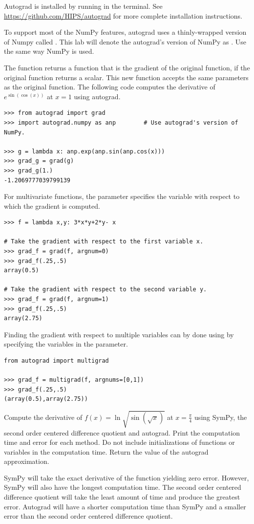 Autograd is installed by running  in the terminal.
See \url{https://github.com/HIPS/autograd} for more complete installation instructions.

To support most of the NumPy features, autograd uses a thinly-wrapped version of Numpy called .
This lab will denote the autograd's version of NumPy as .
Use  the same way NumPy is used.

The function  returns a function that is the gradient of the original function, if the original function returns a scalar.
This new function accepts the same parameters as the original function.
The following code computes the derivative of $e^{\sin\left(\cos\left(x\right)\right)}$ at $x=1$ using autograd.
\begin{lstlisting}
>>> from autograd import grad
>>> import autograd.numpy as anp        # Use autograd's version of NumPy.

>>> g = lambda x: anp.exp(anp.sin(anp.cos(x)))
>>> grad_g = grad(g)
>>> grad_g(1.)
-1.2069777039799139
\end{lstlisting}

For multivariate functions, the parameter  specifies the variable with respect to which the gradient is computed.
\begin{lstlisting}
>>> f = lambda x,y: 3*x*y+2*y- x

# Take the gradient with respect to the first variable x.
>>> grad_f = grad(f, argnum=0)
>>> grad_f(.25,.5)
array(0.5)

# Take the gradient with respect to the second variable y.
>>> grad_f = grad(f, argnum=1)
>>> grad_f(.25,.5)
array(2.75)
\end{lstlisting}

Finding the gradient with respect to multiple variables can by done using  by specifying the variables in the  parameter.

\begin{lstlisting}
from autograd import multigrad

>>> grad_f = multigrad(f, argnums=[0,1])
>>> grad_f(.25,.5)
(array(0.5),array(2.75))
\end{lstlisting}

\begin{problem}
Compute the derivative of $f(x) = \ln \sqrt{ \sin \left(\sqrt {x}\right) }$ at $x=\frac{\pi}{4}$ using SymPy, the second order centered difference quotient and autograd.
Print the computation time and error for each method.
Do not include initializations of functions or variables in the computation time.
Return the value of the autograd approximation.

SymPy will take the exact derivative of the function yielding zero error.
However, SymPy will also have the longest computation time.
The second order centered difference quotient will take the least amount of time and produce the greatest error.
Autograd will have a shorter computation time than SymPy and a smaller error than the second order centered difference quotient.
\end{problem}

